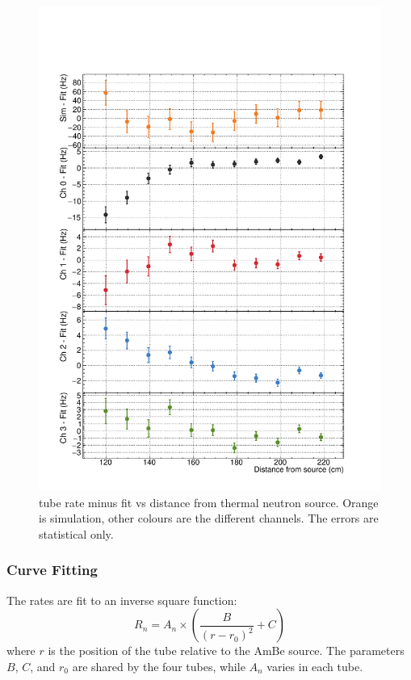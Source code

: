 \begin{figure}
	\centerfloat
		\includegraphics[width=\textwidth]{images/Parallel_Calib_Uncertainties}
	\caption[\He tube rate minus fit vs distance from thermal neutron source]{\He tube rate minus fit vs distance from thermal neutron source. Orange is simulation, other colours are the different channels. The errors are statistical only.}	
	\label{fig:he3rateVsDUncertainty}
\end{figure}


\subsubsection{Curve Fitting}

	The rates are fit to an inverse square function:
\begin{equation}
	{R_{n} = A_{n}\times\left(\frac{B}{(r-r_{0})^2}+C\right)}
	\label{eqn:invSq}
\end{equation}	
where $r$ is the position of the \he tube relative to the AmBe source. The parameters $B$, $C$, and $r_{0}$ are shared by the four \he tubes, while $A_{n}$ varies in each \he tube.

